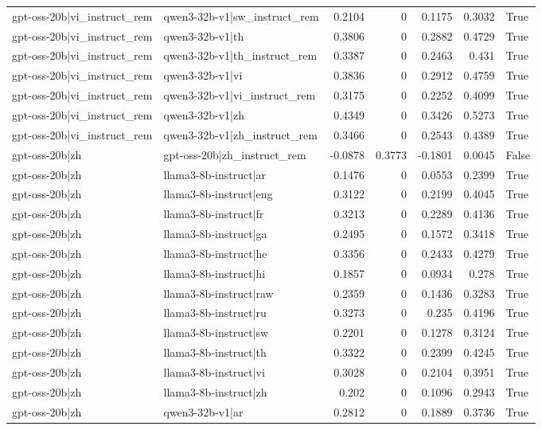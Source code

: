 \begin{table}
\begin{tabular}{l l r r r r l}
gpt-oss-20b|vi_instruct_rem & qwen3-32b-v1|sw_instruct_rem & 0.2104 & 0 & 0.1175 & 0.3032 & True \\
gpt-oss-20b|vi_instruct_rem & qwen3-32b-v1|th & 0.3806 & 0 & 0.2882 & 0.4729 & True \\
gpt-oss-20b|vi_instruct_rem & qwen3-32b-v1|th_instruct_rem & 0.3387 & 0 & 0.2463 & 0.431 & True \\
gpt-oss-20b|vi_instruct_rem & qwen3-32b-v1|vi & 0.3836 & 0 & 0.2912 & 0.4759 & True \\
gpt-oss-20b|vi_instruct_rem & qwen3-32b-v1|vi_instruct_rem & 0.3175 & 0 & 0.2252 & 0.4099 & True \\
gpt-oss-20b|vi_instruct_rem & qwen3-32b-v1|zh & 0.4349 & 0 & 0.3426 & 0.5273 & True \\
gpt-oss-20b|vi_instruct_rem & qwen3-32b-v1|zh_instruct_rem & 0.3466 & 0 & 0.2543 & 0.4389 & True \\
gpt-oss-20b|zh & gpt-oss-20b|zh_instruct_rem & -0.0878 & 0.3773 & -0.1801 & 0.0045 & False \\
gpt-oss-20b|zh & llama3-8b-instruct|ar & 0.1476 & 0 & 0.0553 & 0.2399 & True \\
gpt-oss-20b|zh & llama3-8b-instruct|eng & 0.3122 & 0 & 0.2199 & 0.4045 & True \\
gpt-oss-20b|zh & llama3-8b-instruct|fr & 0.3213 & 0 & 0.2289 & 0.4136 & True \\
gpt-oss-20b|zh & llama3-8b-instruct|ga & 0.2495 & 0 & 0.1572 & 0.3418 & True \\
gpt-oss-20b|zh & llama3-8b-instruct|he & 0.3356 & 0 & 0.2433 & 0.4279 & True \\
gpt-oss-20b|zh & llama3-8b-instruct|hi & 0.1857 & 0 & 0.0934 & 0.278 & True \\
gpt-oss-20b|zh & llama3-8b-instruct|raw & 0.2359 & 0 & 0.1436 & 0.3283 & True \\
gpt-oss-20b|zh & llama3-8b-instruct|ru & 0.3273 & 0 & 0.235 & 0.4196 & True \\
gpt-oss-20b|zh & llama3-8b-instruct|sw & 0.2201 & 0 & 0.1278 & 0.3124 & True \\
gpt-oss-20b|zh & llama3-8b-instruct|th & 0.3322 & 0 & 0.2399 & 0.4245 & True \\
gpt-oss-20b|zh & llama3-8b-instruct|vi & 0.3028 & 0 & 0.2104 & 0.3951 & True \\
gpt-oss-20b|zh & llama3-8b-instruct|zh & 0.202 & 0 & 0.1096 & 0.2943 & True \\
gpt-oss-20b|zh & qwen3-32b-v1|ar & 0.2812 & 0 & 0.1889 & 0.3736 & True \\

\end{tabular}
\end{table}
